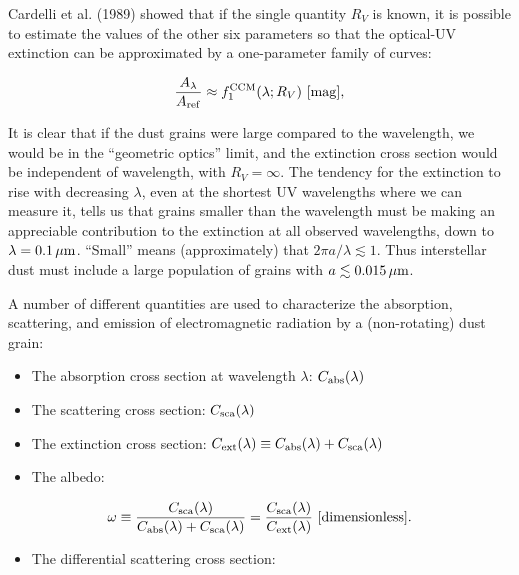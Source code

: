 \documentclass[a4paper,10pt]{article}
\begin{document}
{\noindent}Cardelli et al. (1989) showed that if the single quantity $R_V$ is known, it is possible to estimate the values of the other six parameters so that the optical-UV extinction can be approximated by a one-parameter family of curves:

\begin{align*}
    \frac{A_\lambda}{A_{\rm ref}} \approx f_1^{\rm CCM}(\lambda;R_V) ~ [{\rm mag}],
\end{align*}

{\noindent}It is clear that if the dust grains were large compared to the wavelength, we would be in the ``geometric optics'' limit, and the extinction cross section would be independent of wavelength, with $R_V=\infty$. The tendency for the extinction to rise with decreasing $\lambda$, even at the shortest UV wavelengths where we can measure it, tells us that grains smaller than the wavelength must be making an appreciable contribution to the extinction at all observed wavelengths, down to $\lambda=0.1\,\mu{\rm m}$. ``Small'' means (approximately) that $2\pi a/\lambda\lesssim1$. Thus interstellar dust must include a large population of grains with $a\lesssim0.015\,\mu{\rm m}$.

{\noindent}A number of different quantities are used to characterize the absorption, scattering, and emission of electromagnetic radiation by a (non-rotating) dust grain:

\begin{itemize}
    \item The absorption cross section at wavelength $\lambda$: $C_{\rm abs}(\lambda)$
    \item The scattering cross section: $C_{\rm sca}(\lambda)$
    \item The extinction cross section: $C_{\rm ext}(\lambda) \equiv C_{\rm abs}(\lambda)+C_{\rm sca}(\lambda)$
    \item The albedo:
\end{itemize}

\begin{align*}
    \omega \equiv \frac{C_{\rm sca}(\lambda)}{C_{\rm abs}(\lambda)+C_{\rm sca}(\lambda)} = \frac{C_{\rm sca}(\lambda)}{C_{\rm ext}(\lambda)} ~ [{\rm dimensionless}].
\end{align*}

\begin{itemize}
    \item The differential scattering cross section:
\end{itemize}
\end{document}
